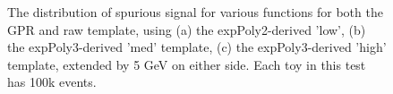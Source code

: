 \begin{figure} 
\begin{center}

\caption{The distribution of spurious signal for various functions for both the GPR and raw template, using (a) the expPoly2-derived 'low', (b) the expPoly3-derived 'med' template, (c) the expPoly3-derived 'high' template, extended by 5 GeV on either side. Each toy in this test has 100k events.}
\label{fig:padded_lowpt_100k_noSig}
\end{center}
\end{figure}

